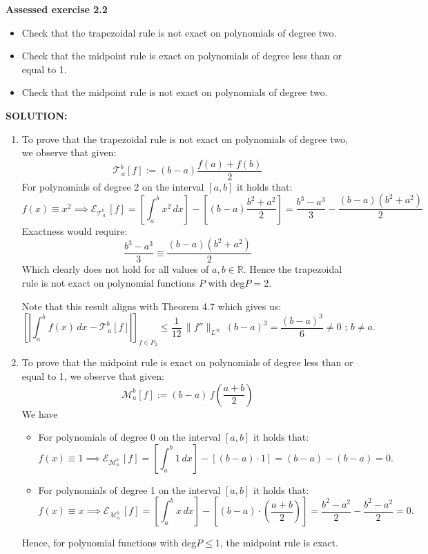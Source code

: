 \documentclass[]{article}
\begin{document}
\noindent\textbf{Assessed exercise 2.2}

\begin{itemize}
  \item Check that the trapezoidal rule is not exact on polynomials of degree two.
  \item Check that the midpoint rule is exact on polynomials of degree less than or equal to 1.
\item Check that the midpoint rule is not exact on polynomials of degree two.
\end{itemize}

\noindent \textbf{SOLUTION:}

\begin{enumerate}
    \item To prove that the trapezoidal rule is not exact on polynomials of degree two, we observe that given:
    \[
    \mathcal{T}_{\,a}^{b}[f] := (b-a)\frac{f(a)+f(b)}{2}
    \]
    \noindent For polynomials of degree $2$ on the interval $[a,b]$ it holds that:
\[
f(x)\equiv x^2 \implies \displaystyle \mathcal{E}_{\mathcal{T}_{\,a}^{b}}\,[f]  = \left[\int_a^b x^2\,dx\right]-\left[\left(b-a\right)\frac{b^2+a^2}{2}\right] = \frac{b^3-a^3}{3} - \frac{(b-a)(b^2+a^2)}{2}
\]
 Exactness would require:
 \[
\frac{b^3-a^3}{3} \equiv \frac{(b-a)(b^2+a^2)}{2}
 \]
 Which clearly does not hold for all values of $a,b \in \mathbb{R}$. Hence the trapezoidal rule is not exact on polynomial functions $P$ with deg$P = 2$.\newline

\noindent Note that this result aligns with Theorem 4.7 which gives us:
\[
\displaystyle
\left[\left|\int_{a}^{b} f(x)\,dx - \mathcal{T}_{\,a}^{b}[f]\right|\right]_{f\in P_2}
\leq \frac{1}{12}\,\|f''\|_{L^\infty}\,(b-a)^{3} = \frac{\left(b-a\right)^3}{6} \neq 0 \, \, ;\, b\neq a.
\]

\item To prove that the midpoint rule is exact on polynomials of degree less than or equal to 1, we observe that given:
\[
\displaystyle \mathcal{M}_{a}^{b}[f] := (b-a)\,f\left(\frac{a+b}{2}\right)
\]
We have
\begin{itemize}
    \item For polynomials of degree 0 on the interval $[a,b]$ it holds that:
\[
f(x) \equiv 1 \implies \displaystyle \mathcal{E}_{\mathcal{M}_{a}^{b}}\,[f]   = \left[\int_a^b 1\,dx\right]-\left[\left(b-a\right)\cdot1\right] = (b-a) - (b-a) = 0.
\]
   \item For polynomials of degree 1 on the interval $[a,b]$ it holds that:
\[
f(x) \equiv x \implies \displaystyle \mathcal{E}_{\mathcal{M}_{a}^{b}}\,[f]   = \left[\int_a^b x\,dx\right]-\left[\left(b-a\right)\cdot\left(\frac{a+b}{2}\right)\right] = \frac{b^2-a^2}{2}-\frac{b^2-a^2}{2} = 0.
\]
\end{itemize}
\noindent Hence, for polynomial functions with deg$P\leq1$, the midpoint rule is exact.\newline


\end{enumerate}
\end{document}
